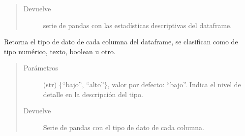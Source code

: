 \documentclass[letterpaper,10pt,openany,spanish]{sphinxmanual}
\begin{document}
\begin{fulllineitems}
\begin{fulllineitems}
\begin{quote}
\begin{description}
\begin{itemize}
\end{itemize}

\item[{Devuelve}] \leavevmode
serie de pandas con las estadísticas descriptivas del dataframe.

\end{description}\end{quote}

\end{fulllineitems}


\begin{fulllineitems}
\label{\detokenize{calidad_datos:calidad_datos.CalidadDatos.TipoColumnas}}
Retorna el tipo de dato de cada columna del dataframe, se             clasifican como de tipo numérico, texto, boolean u otro.
\begin{quote}\begin{description}
\item[{Parámetros}] \leavevmode
{} \textendash{} (str) \{“bajo”, “alto”\}, valor por defecto: “bajo”.             Indica el nivel de detalle en la descripción del tipo.

\item[{Devuelve}] \leavevmode
Serie de pandas con el tipo de dato de cada columna.

\end{description}\end{quote}

\end{fulllineitems}



\end{fulllineitems}
\end{document}
